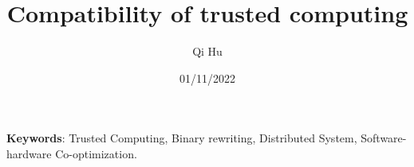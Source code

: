 \documentclass[a4paper,11pt]{article}
\title{Compatibility of trusted computing}
\author{Qi Hu}
\date{01/11/2022}
\newcommand\keywords[1]{\textbf{Keywords}: #1}
\begin{document}
  \maketitle%
  \keywords{Trusted Computing, Binary rewriting, Distributed System, Software-hardware Co-optimization.}

  
  
  
  
  
  

  
  
\end{document}
